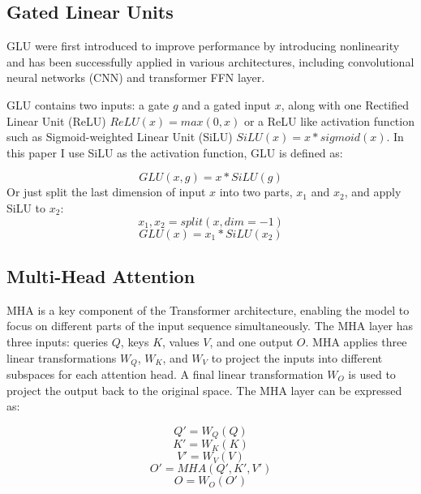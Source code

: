 \documentclass[11pt]{article}
\begin{document}
\subsection{Gated Linear Units}

GLU were first introduced to improve performance by introducing nonlinearity and has been successfully applied in various architectures, including convolutional neural networks (CNN)\cite{dauphin2017languagemodelinggatedconvolutional} and transformer FFN layer\cite{shazeer2020gluvariantsimprovetransformer}.

GLU contains two inputs: a gate $g$ and a gated input $x$, along with one Rectified Linear Unit\cite{fukushima1975relu} (ReLU) $ReLU(x)=max(0,x)$ or a ReLU like activation function such as Sigmoid-weighted Linear Unit (SiLU) $SiLU(x)=x*sigmoid(x)$. In this paper I use SiLU\cite{elfwing2017sigmoidweightedlinearunitsneural} as the activation function, GLU is defined as:



\begin{equation}
GLU(x,g) = x*SiLU(g)
\end{equation}
Or just split the last dimension of input $x$ into two parts, $x_1$ and $x_2$, and apply SiLU to $x_2$:
\begin{equation}
x_1, x_2 = split(x,dim=-1)
\end{equation}
\begin{equation}
GLU(x) = x_1 * SiLU(x_2)
\label{eq:glu}
\end{equation}

\subsection{Multi-Head Attention}

MHA is a key component of the Transformer architecture, enabling the model to focus on different parts of the input sequence simultaneously. The MHA layer has three inputs: queries $Q$, keys $K$, values $V$, and one output $O$. MHA applies three linear transformations $W_Q$, $W_K$, and $W_V$ to project the inputs into different subspaces for each attention head. A final linear transformation $W_O$ is used to project the output back to the original space. The MHA layer can be expressed as:

\begin{equation}
Q' = W_Q(Q)
\end{equation}
\begin{equation}
K' = W_K(K)
\end{equation}
\begin{equation}
V' = W_V(V)
\label{eq:mha_v}
\end{equation}
\begin{equation}
O' = MHA(Q', K', V')
\end{equation}
\begin{equation}
O = W_O(O')
\end{equation}
\end{document}
